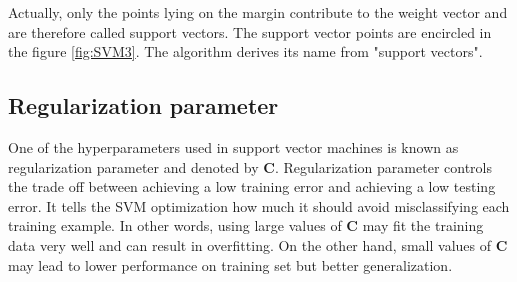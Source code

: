 Actually, only the points lying on the margin contribute to the weight vector and are therefore called support vectors. The support vector points are encircled in the figure \ref{fig:SVM3}. The algorithm derives its name from "support vectors".

\subsection{Regularization parameter} \label{subsec:RegPar}

One of the hyperparameters used in support vector machines is known as regularization parameter and denoted by $\mathbf{C}$. Regularization parameter controls the trade off between achieving a low training error and achieving a low testing error. It tells the SVM optimization how much it should avoid misclassifying each training example. In other words, using large values of $\mathbf{C}$ may fit the training data very well and can result in overfitting. On the other hand, small values of $\mathbf{C}$ may lead to lower performance on training set but better generalization.
